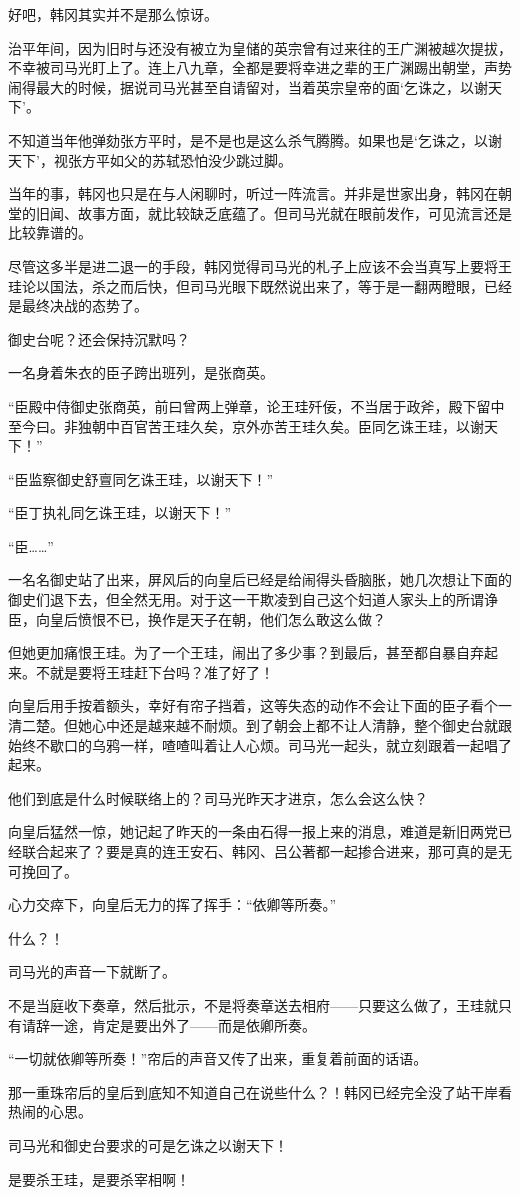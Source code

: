 好吧，韩冈其实并不是那么惊讶。

治平年间，因为旧时与还没有被立为皇储的英宗曾有过来往的王广渊被越次提拔，不幸被司马光盯上了。连上八九章，全都是要将幸进之辈的王广渊踢出朝堂，声势闹得最大的时候，据说司马光甚至自请留对，当着英宗皇帝的面‘乞诛之，以谢天下’。

不知道当年他弹劾张方平时，是不是也是这么杀气腾腾。如果也是‘乞诛之，以谢天下’，视张方平如父的苏轼恐怕没少跳过脚。

当年的事，韩冈也只是在与人闲聊时，听过一阵流言。并非是世家出身，韩冈在朝堂的旧闻、故事方面，就比较缺乏底蕴了。但司马光就在眼前发作，可见流言还是比较靠谱的。

尽管这多半是进二退一的手段，韩冈觉得司马光的札子上应该不会当真写上要将王珪论以国法，杀之而后快，但司马光眼下既然说出来了，等于是一翻两瞪眼，已经是最终决战的态势了。

御史台呢？还会保持沉默吗？

一名身着朱衣的臣子跨出班列，是张商英。

“臣殿中侍御史张商英，前曰曾两上弹章，论王珪歼佞，不当居于政斧，殿下留中至今曰。非独朝中百官苦王珪久矣，京外亦苦王珪久矣。臣同乞诛王珪，以谢天下！”

“臣监察御史舒亶同乞诛王珪，以谢天下！”

“臣丁执礼同乞诛王珪，以谢天下！”

“臣……”

一名名御史站了出来，屏风后的向皇后已经是给闹得头昏脑胀，她几次想让下面的御史们退下去，但全然无用。对于这一干欺凌到自己这个妇道人家头上的所谓诤臣，向皇后愤恨不已，换作是天子在朝，他们怎么敢这么做？

但她更加痛恨王珪。为了一个王珪，闹出了多少事？到最后，甚至都自暴自弃起来。不就是要将王珪赶下台吗？准了好了！

向皇后用手按着额头，幸好有帘子挡着，这等失态的动作不会让下面的臣子看个一清二楚。但她心中还是越来越不耐烦。到了朝会上都不让人清静，整个御史台就跟始终不歇口的乌鸦一样，喳喳叫着让人心烦。司马光一起头，就立刻跟着一起唱了起来。

他们到底是什么时候联络上的？司马光昨天才进京，怎么会这么快？

向皇后猛然一惊，她记起了昨天的一条由石得一报上来的消息，难道是新旧两党已经联合起来了？要是真的连王安石、韩冈、吕公著都一起掺合进来，那可真的是无可挽回了。

心力交瘁下，向皇后无力的挥了挥手：“依卿等所奏。”

什么？！

司马光的声音一下就断了。

不是当庭收下奏章，然后批示，不是将奏章送去相府——只要这么做了，王珪就只有请辞一途，肯定是要出外了——而是依卿所奏。

“一切就依卿等所奏！”帘后的声音又传了出来，重复着前面的话语。

那一重珠帘后的皇后到底知不知道自己在说些什么？！韩冈已经完全没了站干岸看热闹的心思。

司马光和御史台要求的可是乞诛之以谢天下！

是要杀王珪，是要杀宰相啊！

